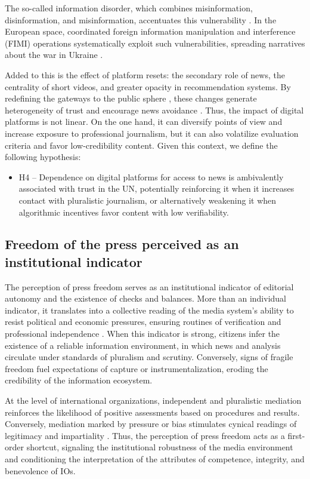 \documentclass[english]{textolivre}
\begin{document}
The so-called information disorder, which combines misinformation, disinformation, and misinformation, accentuates this vulnerability \cite{wardle2017}. In the European space, coordinated foreign information manipulation and interference (FIMI) operations systematically exploit such vulnerabilities, spreading narratives about the war in Ukraine \cite{eeas2024}.

Added to this is the effect of platform resets: the secondary role of news, the centrality of short videos, and greater opacity in recommendation systems. By redefining the gateways to the public sphere \cite{antonelli2025}, these changes generate heterogeneity of trust and encourage news avoidance \cite{reuters2024}. Thus, the impact of digital platforms is not linear. On the one hand, it can diversify points of view and increase exposure to professional journalism, but it can also volatilize evaluation criteria and favor low-credibility content. Given this context, we define the following hypothesis:

\begin{itemize}
    \item H4 -- Dependence on digital platforms for access to news is ambivalently associated with trust in the UN, potentially reinforcing it when it increases contact with pluralistic journalism, or alternatively weakening it when algorithmic incentives favor content with low verifiability.
\end{itemize}

\subsection{Freedom of the press perceived as an institutional indicator}
The perception of press freedom serves as an institutional indicator of editorial autonomy and the existence of checks and balances. More than an individual indicator, it translates into a collective reading of the media system’s ability to resist political and economic pressures, ensuring routines of verification and professional independence \cite{stromback2014}. When this indicator is strong, citizens infer the existence of a reliable information environment, in which news and analysis circulate under standards of pluralism and scrutiny. Conversely, signs of fragile freedom fuel expectations of capture or instrumentalization, eroding the credibility of the information ecosystem.

At the level of international organizations, independent and pluralistic mediation reinforces the likelihood of positive assessments based on procedures and results. Conversely, mediation marked by pressure or bias stimulates cynical readings of legitimacy and impartiality \cite{dellmuth2020}. Thus, the perception of press freedom acts as a first-order shortcut, signaling the institutional robustness of the media environment and conditioning the interpretation of the attributes of competence, integrity, and benevolence of IOs.
\end{document}
